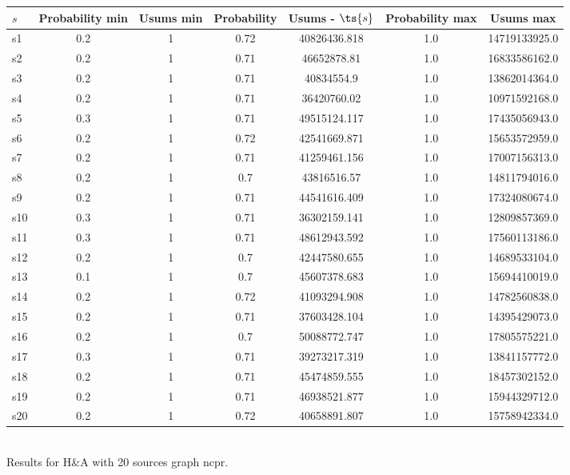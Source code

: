 \documentclass{article}
\begin{document}
\noindent\begin{tabular}{|l|c|c|c|c|c|c|}
\hline
$s$& Probability min & Usums min & Probability & Usums - $\ts{s}$ & Probability max & Usums max\\
\hline
s1 &0.2 & 1 & 0.72 & 40826436.818 & 1.0 & 14719133925.0\\
\hline
s2 &0.2 & 1 & 0.71 & 46652878.81 & 1.0 & 16833586162.0\\
\hline
s3 &0.2 & 1 & 0.71 & 40834554.9 & 1.0 & 13862014364.0\\
\hline
s4 &0.2 & 1 & 0.71 & 36420760.02 & 1.0 & 10971592168.0\\
\hline
s5 &0.3 & 1 & 0.71 & 49515124.117 & 1.0 & 17435056943.0\\
\hline
s6 &0.2 & 1 & 0.72 & 42541669.871 & 1.0 & 15653572959.0\\
\hline
s7 &0.2 & 1 & 0.71 & 41259461.156 & 1.0 & 17007156313.0\\
\hline
s8 &0.2 & 1 & 0.7 & 43816516.57 & 1.0 & 14811794016.0\\
\hline
s9 &0.2 & 1 & 0.71 & 44541616.409 & 1.0 & 17324080674.0\\
\hline
s10 &0.3 & 1 & 0.71 & 36302159.141 & 1.0 & 12809857369.0\\
\hline
s11 &0.3 & 1 & 0.71 & 48612943.592 & 1.0 & 17560113186.0\\
\hline
s12 &0.2 & 1 & 0.7 & 42447580.655 & 1.0 & 14689533104.0\\
\hline
s13 &0.1 & 1 & 0.7 & 45607378.683 & 1.0 & 15694410019.0\\
\hline
s14 &0.2 & 1 & 0.72 & 41093294.908 & 1.0 & 14782560838.0\\
\hline
s15 &0.2 & 1 & 0.71 & 37603428.104 & 1.0 & 14395429073.0\\
\hline
s16 &0.2 & 1 & 0.7 & 50088772.747 & 1.0 & 17805575221.0\\
\hline
s17 &0.3 & 1 & 0.71 & 39273217.319 & 1.0 & 13841157772.0\\
\hline
s18 &0.2 & 1 & 0.71 & 45474859.555 & 1.0 & 18457302152.0\\
\hline
s19 &0.2 & 1 & 0.71 & 46938521.877 & 1.0 & 15944329712.0\\
\hline
s20 &0.2 & 1 & 0.72 & 40658891.807 & 1.0 & 15758942334.0\\
\hline
\end{tabular}\\

\noindent Results for H\&A with 20 sources graph ncpr.
\end{document}
